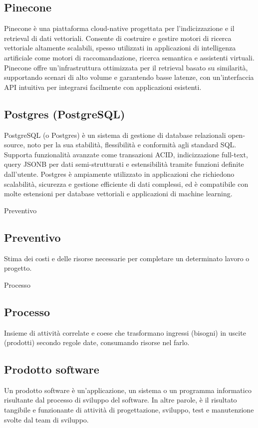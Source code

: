 \hypertarget{sec:pinecone}{}
\subsection*{Pinecone}
Pinecone è una piattaforma cloud-native progettata per l'indicizzazione e il retrieval di dati vettoriali. Consente di costruire e gestire motori di 
ricerca vettoriale altamente scalabili, spesso utilizzati in applicazioni di intelligenza artificiale come motori di raccomandazione, ricerca semantica 
e assistenti virtuali. Pinecone offre un'infrastruttura ottimizzata per il retrieval basato su similarità, supportando scenari di alto volume e 
garantendo basse latenze, con un'interfaccia API intuitiva per integrarsi facilmente con applicazioni esistenti.

\hypertarget{sec:postgres}{}
\subsection*{Postgres (PostgreSQL)}
PostgreSQL (o Postgres) è un sistema di gestione di database relazionali open-source, noto per la sua stabilità, flessibilità e conformità agli standard SQL. 
Supporta funzionalità avanzate come transazioni ACID, indicizzazione full-text, query JSONB per dati semi-strutturati e estensibilità tramite funzioni 
definite dall'utente. Postgres è ampiamente utilizzato in applicazioni che richiedono scalabilità, sicurezza e gestione efficiente di dati complessi, ed è 
compatibile con molte estensioni per database vettoriali e applicazioni di machine learning.

\hypertarget{sec:preventivo}{Preventivo}
\subsection*{Preventivo}
Stima dei costi e delle risorse necessarie per completare un determinato lavoro o progetto.

\hypertarget{sec:processo}{Processo}
\subsection*{Processo}
Insieme di attività correlate e coese che trasformano ingressi (bisogni) in uscite (prodotti) secondo regole date,
consumando risorse nel farlo.

\hypertarget{sec:prodotto_software}{}
\subsection*{Prodotto software}
Un prodotto software è un’applicazione, un sistema o un programma
informatico risultante dal processo di sviluppo del software. In altre parole, è il risultato
tangibile e funzionante di attività di progettazione, sviluppo, test e manutenzione svolte dal
team di sviluppo.

